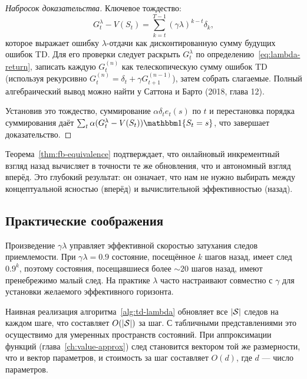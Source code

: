 \begin{proof}[Набросок доказательства]
Ключевое тождество:
\[
G_t^\lambda - V(S_t) = \sum_{k=t}^{T-1}(\gamma\lambda)^{k-t}\delta_k,
\]
которое выражает ошибку $\lambda$-отдачи как дисконтированную сумму будущих ошибок TD.  Для его проверки следует раскрыть $G_t^\lambda$ по определению~\eqref{eq:lambda-return}, записать каждую $G_t^{(n)}$ как телескопическую сумму ошибок TD (используя рекурсивно $G_t^{(n)} = \delta_t + \gamma G_{t+1}^{(n-1)}$), затем собрать слагаемые.  Полный алгебраический вывод можно найти у Саттона и Барто (2018, глава 12).

Установив это тождество, суммирование $\alpha\delta_t e_t(s)$ по $t$ и перестановка порядка суммирования даёт $\sum_t \alpha(G_t^\lambda-V(S_t))\ind\{S_t=s\}$, что завершает доказательство.
\end{proof}

Теорема~\ref{thm:fb-equivalence} подтверждает, что онлайновый инкрементный взгляд назад вычисляет в точности те же обновления, что и автономный взгляд вперёд.  Это глубокий результат: он означает, что нам не нужно выбирать между концептуальной ясностью (вперёд) и вычислительной эффективностью (назад).

\subsection{Практические соображения}

\begin{remark}
Произведение $\gamma\lambda$ управляет эффективной скоростью затухания следов приемлемости.  При $\gamma\lambda = 0.9$ состояние, посещённое $k$ шагов назад, имеет след $0.9^k$, поэтому состояния, посещавшиеся более $\sim 20$ шагов назад, имеют пренебрежимо малый след.  На практике $\lambda$ часто настраивают совместно с $\gamma$ для установки желаемого эффективного горизонта.
\end{remark}

\begin{remark}
Наивная реализация алгоритма~\ref{alg:td-lambda} обновляет все $|\mathcal{S}|$ следов на каждом шаге, что составляет $O(|\mathcal{S}|)$ за шаг.  С табличными представлениями это осуществимо для умеренных пространств состояний.  При аппроксимации функций (глава~\ref{ch:value-approx}) след становится вектором той же размерности, что и вектор параметров, и стоимость за шаг составляет $O(d)$, где $d$ --- число параметров.
\end{remark}

